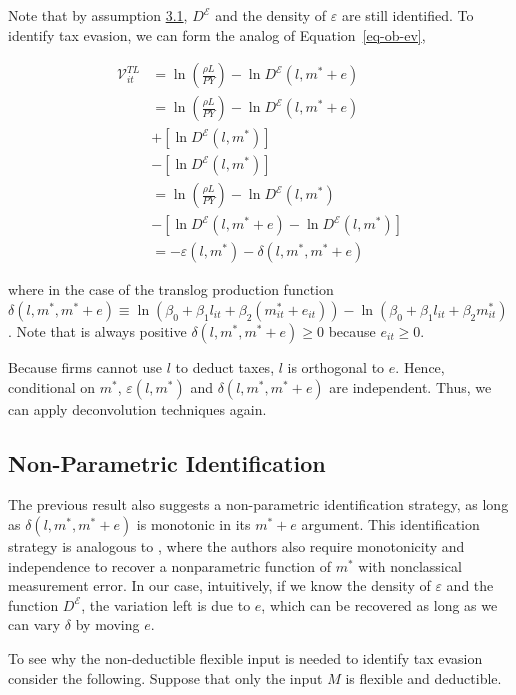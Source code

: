 \documentclass[
  12pt]{article}
\theoremstyle{definition}
\theoremstyle{remark}
\begin{document}
Note that by assumption \hyperref[ass-non-ev]{3.1}, \(D^{\mathcal{E}}\)
and the density of \(\varepsilon\) are still identified. To identify tax
evasion, we can form the analog of Equation~\ref{eq-ob-ev},

\[
\begin{aligned}
\mathcal{V}_{it}^{TL} &=\ln\left(\frac{\rho L}{PY}\right)-\ln D^{\mathcal{E}}(l,m^*+e)\\
    &=\ln\left(\frac{\rho L}{PY}\right)-\ln D^{\mathcal{E}}(l,m^*+e)\\
    &+\left[\ln D^{\mathcal{E}}(l,m^*)\right]\\
    &-\left[\ln D^{\mathcal{E}}(l,m^*)\right] \\
    &=\ln\left(\frac{\rho L}{PY}\right)-\ln D^{\mathcal{E}}(l,m^*) \\
    &-\left[\ln D^{\mathcal{E}}(l,m^*+e)-\ln D^{\mathcal{E}}(l,m^*)\right]\\
    &= -\varepsilon(l,m^*) - \delta(l,m^*,m^*+e)
\end{aligned}
\]

where in the case of the translog production function
\(\delta(l,m^*,m^*+e)\equiv \ln \left(\beta_0+\beta_1l_{it}+\beta_2(m^*_{it}+e_{it})\right)-\ln \left(\beta_0+\beta_1l_{it}+\beta_2m^*_{it}\right)\).
Note that is always positive \(\delta(l,m^*,m^*+e)\ge0\) because
\(e_{it}\ge0\).

Because firms cannot use \(l\) to deduct taxes, \(l\) is orthogonal to
\(e\). Hence, conditional on \(m^*\), \(\varepsilon(l,m^*)\) and
\(\delta(l,m^*,m^*+e)\) are independent. Thus, we can apply
deconvolution techniques again.

\subsection{Non-Parametric
Identification}\label{non-parametric-identification}

The previous result also suggests a non-parametric identification
strategy, as long as \(\delta(l,m^*,m^*+e)\) is monotonic in its
\(m^*+e\) argument. This identification strategy is analogous to
\citet{Hu2022b}, where the authors also require monotonicity and
independence to recover a nonparametric function of \(m^*\) with
nonclassical measurement error. In our case, intuitively, if we know the
density of \(\varepsilon\) and the function \(D^{\mathcal{E}}\), the
variation left is due to \(e\), which can be recovered as long as we can
vary \(\delta\) by moving \(e\).

To see why the non-deductible flexible input is needed to identify tax
evasion consider the following. Suppose that only the input \(M\) is
flexible and deductible.
\end{document}
